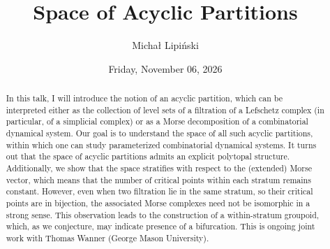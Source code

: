 \documentclass{UAmathtalk}
\author{Micha\l{} Lipi\'nski}
\title{Space of Acyclic Partitions}
\date{Friday, November 06, 2026}
\begin{document}
\maketitle
\renewcommand*{\abstractsize}{\fontsize{13.5}{16.2}\selectfont}
\begin{abstract}
    {
        In this talk, I will introduce the notion of an acyclic partition, which can be interpreted either as the collection of level sets of a filtration of a Lefschetz complex (in particular, of a simplicial complex) or as a Morse decomposition of a combinatorial dynamical system. Our goal is to understand the space of all such acyclic partitions, within which one can study parameterized combinatorial dynamical systems. It turns out that the space of acyclic partitions admits an explicit polytopal structure. Additionally, we show that the space stratifies with respect to the (extended) Morse vector, which means that the number of critical points within each stratum remains constant. However, even when two filtration lie in the same stratum, so their critical points are in bijection, the associated Morse complexes need not be isomorphic in a strong sense. This observation leads to the construction of a within-stratum groupoid, which, as we conjecture, may indicate presence of a bifurcation. This is ongoing joint work with Thomas Wanner (George Mason University).    }
\end{abstract}
\end{document}
